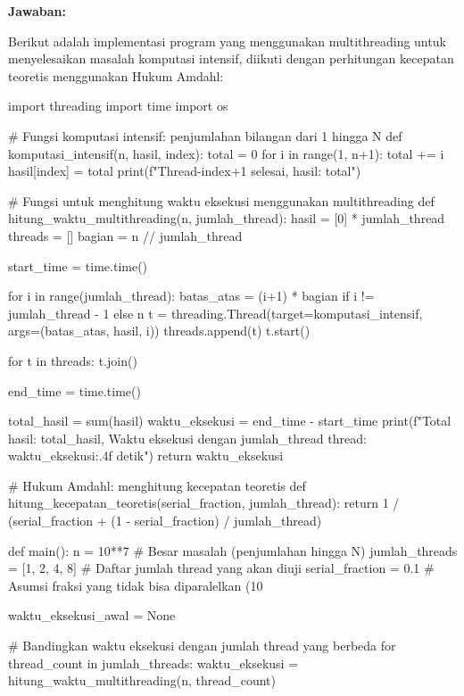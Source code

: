 \documentclass[12pt]{article}
\begin{document}
    \textbf{Jawaban:}
    \par Berikut adalah implementasi program yang menggunakan multithreading untuk menyelesaikan masalah komputasi intensif, diikuti dengan perhitungan kecepatan teoretis menggunakan Hukum Amdahl:
    \begin{python}
    import threading
    import time
    import os

    # Fungsi komputasi intensif: penjumlahan bilangan dari 1 hingga N
    def komputasi_intensif(n, hasil, index):
        total = 0
        for i in range(1, n+1):
            total += i
        hasil[index] = total
        print(f"Thread-{index+1} selesai, hasil: {total}")

    # Fungsi untuk menghitung waktu eksekusi menggunakan multithreading
    def hitung_waktu_multithreading(n, jumlah_thread):
        hasil = [0] * jumlah_thread
        threads = []
        bagian = n // jumlah_thread

        start_time = time.time()

        for i in range(jumlah_thread):
            batas_atas = (i+1) * bagian if i != jumlah_thread - 1 else n
            t = threading.Thread(target=komputasi_intensif, args=(batas_atas, hasil, i))
            threads.append(t)
            t.start()

        for t in threads:
            t.join()

        end_time = time.time()

        total_hasil = sum(hasil)
        waktu_eksekusi = end_time - start_time
        print(f"Total hasil: {total_hasil}, Waktu eksekusi dengan {jumlah_thread} thread: {waktu_eksekusi:.4f} detik")
        return waktu_eksekusi

    # Hukum Amdahl: menghitung kecepatan teoretis
    def hitung_kecepatan_teoretis(serial_fraction, jumlah_thread):
        return 1 / (serial_fraction + (1 - serial_fraction) / jumlah_thread)

    def main():
        n = 10**7  # Besar masalah (penjumlahan hingga N)
        jumlah_threads = [1, 2, 4, 8]  # Daftar jumlah thread yang akan diuji
        serial_fraction = 0.1  # Asumsi fraksi yang tidak bisa diparalelkan (10%

        waktu_eksekusi_awal = None

        # Bandingkan waktu eksekusi dengan jumlah thread yang berbeda
        for thread_count in jumlah_threads:
            waktu_eksekusi = hitung_waktu_multithreading(n, thread_count)


\end{python}
\end{document}
